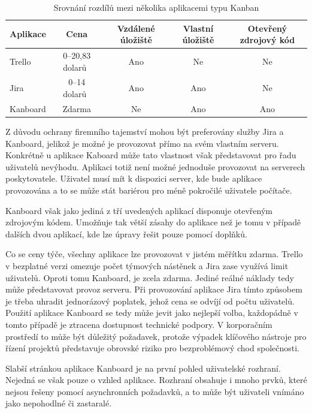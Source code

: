 \begin{table}[H]
\centering
\caption{Srovnání rozdílů mezi několika aplikacemi typu Kanban}
\label{tab:kanban-sum}
\begin{tabular}{ |l|c|c|c|c| } 
\hline
Aplikace & Cena\footnotemark & Vzdálené úložiště & Vlastní úložiště & Otevřený zdrojový kód  \\
\hline
Trello & 0--20,83 dolarů~\cite{bib:trello-pricing} & Ano & Ne & Ne \\ 
Jira & 0--14 dolarů~\cite{bib:jira-pricing} & Ano & Ano & Ne \\ 
Kanboard & Zdarma & Ne & Ano & Ano \\ 
\hline
\end{tabular}
\end{table}

Z důvodu ochrany firemního tajemství mohou být preferovány služby Jira a Kanboard, jelikož je možné je provozovat přímo na svém vlastním serveru. Konkrétně u aplikace Kaboard může tato vlastnost však představovat pro řadu uživatelů nevýhodu. Aplikaci totiž není možné jednoduše provozovat na serverech poskytovatele. Uživatel musí mít k dispozici server, kde bude aplikace provozována a to se může stát bariérou pro méně pokročilé uživatele počítače.

Kanboard však jako jediná z tří uvedených aplikací disponuje otevřeným zdrojovým kódem. Umožňuje tak větší zásahy do aplikace než je tomu v případě dalších dvou aplikací, kde lze úpravy řešit pouze pomocí doplňků.

Co se ceny týče, všechny aplikace lze provozovat v jistém měřítku zdarma. Trello v bezplatné verzi omezuje počet týmových nástěnek a Jira zase využívá limit uživatelů. Oproti tomu Kanboard, je zcela zdarma. Jediné reálné náklady tedy může představovat provoz serveru. Při provozování aplikace Jira tímto způsobem je třeba uhradit jednorázový poplatek, jehož cena se odvíjí od počtu uživatelů. Použití aplikace Kanboard se tedy může jevit jako nejlepší volba, každopádně v tomto případě je ztracena dostupnost technické podpory. V korporačním prostředí to může být důležitý požadavek, protože výpadek klíčového nástroje pro řízení projektů představuje obrovské riziko pro bezproblémový chod společnosti.

Slabší stránkou aplikace Kanboard je na první pohled uživatelské rozhraní. Nejedná se však pouze o vzhled aplikace. Rozhraní obsahuje i mnoho prvků, které nejsou řešeny pomocí asynchronních požadavků, a to může být uživateli vnímáno jako nepohodlné či zastaralé.

